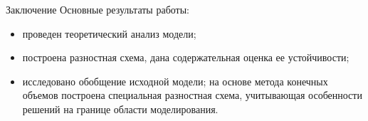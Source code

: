
\begin{frame}{Заключение}
Основные результаты работы:
\begin{itemize}
    \item проведен теоретический анализ модели;
    \item построена разностная схема, дана содержательная оценка ее устойчивости;
    \item исследовано обобщение исходной модели; на основе метода конечных объемов построена
    специальная разностная схема, учитывающая особенности решений на границе области моделирования.
\end{itemize}
\end{frame}